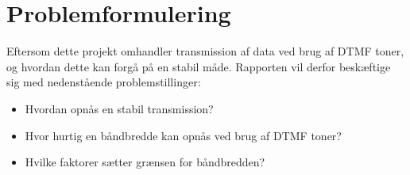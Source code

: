 \newpage
\section{Problemformulering}
Eftersom dette projekt omhandler transmission af data ved brug af DTMF toner, og hvordan dette kan forgå på en stabil måde. Rapporten vil derfor beskæftige sig med nedenstående problemstillinger:

\begin{itemize}[noitemsep]
	\item	Hvordan opnås en stabil transmission?
	\item	Hvor hurtig en båndbredde kan opnås ved brug af DTMF toner?
	\item   Hvilke faktorer sætter grænsen for båndbredden?

\end{itemize}

